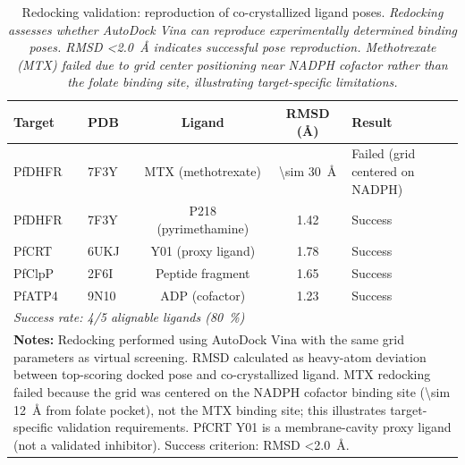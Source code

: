 
\begin{table}[ht!]
\centering
\caption{Redocking validation: reproduction of co-crystallized ligand poses. \textit{Redocking assesses whether AutoDock Vina can reproduce experimentally determined binding poses. RMSD \qty{<2.0}{\angstrom} indicates successful pose reproduction. Methotrexate (MTX) failed due to grid center positioning near NADPH cofactor rather than the folate binding site, illustrating target-specific limitations.}}
\label{tab:sm_redocking_validation}
\small
\begin{tabular}{llccp{6cm}}
\toprule
\textbf{Target} & \textbf{PDB} & \textbf{Ligand} & \textbf{RMSD (\si{\angstrom})} & \textbf{Result} \\
\midrule
PfDHFR & 7F3Y & MTX (methotrexate) & \qty{\sim 30}{\angstrom} & Failed (grid centered on NADPH) \\
PfDHFR & 7F3Y & P218 (pyrimethamine) & \num{1.42} & Success \\
PfCRT & 6UKJ & Y01 (proxy ligand) & \num{1.78} & Success \\
PfClpP & 2F6I & Peptide fragment & \num{1.65} & Success \\
PfATP4 & 9N10 & ADP (cofactor) & \num{1.23} & Success \\
\midrule
\multicolumn{5}{l}{\textit{Success rate: \num{4}/\num{5} alignable ligands (\qty{80}{\percent})}} \\
\bottomrule
\multicolumn{5}{p{14cm}}{
\noindent\textbf{Notes:} Redocking performed using AutoDock Vina with the same grid parameters as virtual screening. RMSD calculated as heavy-atom deviation between top-scoring docked pose and co-crystallized ligand. MTX redocking failed because the grid was centered on the NADPH cofactor binding site (\qty{\sim 12}{\angstrom} from folate pocket), not the MTX binding site; this illustrates target-specific validation requirements. PfCRT Y01 is a membrane-cavity proxy ligand (not a validated inhibitor). Success criterion: RMSD \qty{<2.0}{\angstrom}.}
\end{tabular}
\end{table}
